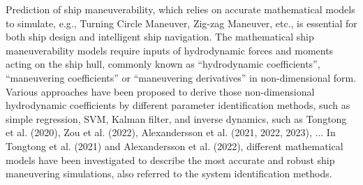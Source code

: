 Prediction of ship maneuverability, which relies on accurate mathematical models to simulate, e.g., Turning Circle Maneuver, Zig-zag Maneuver, etc., is essential for both ship design and intelligent ship navigation. The mathematical ship maneuverability models require inputs of hydrodynamic forces and moments acting on the ship hull, commonly known as “hydrodynamic coefficients”, “maneuvering coefficients” or “maneuvering derivatives” in non-dimensional form. Various approaches have been proposed to derive those non-dimensional hydrodynamic coefficients by different parameter identification methods, such as simple regression, SVM, Kalman filter, and inverse dynamics, such as Tongtong et al. (2020), Zou et al. (2022), Alexandersson et al. (2021, 2022, 2023), ... In Tongtong et al. (2021) and Alexandersson et al. (2022), different mathematical models have been investigated to describe the most accurate and robust ship maneuvering simulations, also referred to the system identification methods.

